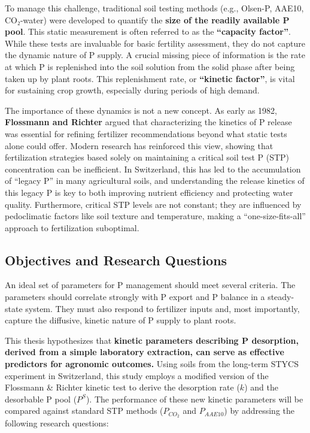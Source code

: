 \documentclass[
  letterpaper,
  DIV=11,
  numbers=noendperiod]{scrartcl}
\begin{document}
To manage this challenge, traditional soil testing methods (e.g.,
Olsen-P, AAE10, CO₂-water) were developed to quantify the \textbf{size
of the readily available P pool}. This static measurement is often
referred to as the \textbf{``capacity factor''}. While these tests are
invaluable for basic fertility assessment, they do not capture the
dynamic nature of P supply. A crucial missing piece of information is
the rate at which P is replenished into the soil solution from the solid
phase after being taken up by plant roots. This replenishment rate, or
\textbf{``kinetic factor''}, is vital for sustaining crop growth,
especially during periods of high demand.

The importance of these dynamics is not a new concept. As early as 1982,
\textbf{Flossmann and Richter} argued that characterizing the kinetics
of P release was essential for refining fertilizer recommendations
beyond what static tests alone could offer. Modern research has
reinforced this view, showing that fertilization strategies based solely
on maintaining a critical soil test P (STP) concentration can be
inefficient. In Switzerland, this has led to the accumulation of
``legacy P'' in many agricultural soils, and understanding the release
kinetics of this legacy P is key to both improving nutrient efficiency
and protecting water quality. Furthermore, critical STP levels are not
constant; they are influenced by pedoclimatic factors like soil texture
and temperature, making a ``one-size-fits-all'' approach to
fertilization suboptimal.

\subsection{Objectives and Research
Questions}\label{objectives-and-research-questions}

An ideal set of parameters for P management should meet several
criteria. The parameters should correlate strongly with P export and P
balance in a steady-state system. They must also respond to fertilizer
inputs and, most importantly, capture the diffusive, kinetic nature of P
supply to plant roots.

This thesis hypothesizes that \textbf{kinetic parameters describing P
desorption, derived from a simple laboratory extraction, can serve as
effective predictors for agronomic outcomes.} Using soils from the
long-term STYCS experiment in Switzerland, this study employs a modified
version of the Flossmann \& Richter kinetic test to derive the
desorption rate (\(k\)) and the desorbable P pool (\(P^S\)). The
performance of these new kinetic parameters will be compared against
standard STP methods (\(P_{CO_2}\) and \(P_{AAE10}\)) by addressing the
following research questions:
\end{document}
